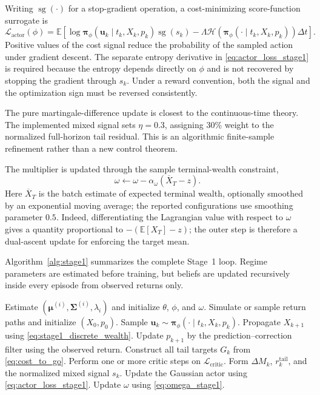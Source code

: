 \documentclass[a4paper,10pt]{article}
\newcommand{\E}{\mathbb{E}}
\newcommand{\bpi}{\bm{\pi}}
\newcommand{\bmu}{\bm{\mu}}
\newcommand{\bu}{\bm{u}}
\newcommand{\bSigma}{\bm{\Sigma}}
\newcommand{\cH}{\mathcal{H}}
\begin{document}
Writing $\operatorname{sg}(\cdot)$ for a stop-gradient operation, a cost-minimizing score-function surrogate is
\begin{equation}
\mathcal L_{\mathrm{actor}}(\phi)
=\E\left[
\log\bpi_\phi(\bu_k\mid t_k,X_k,p_k)\operatorname{sg}(s_k)
-\Lambda\cH(\bpi_\phi(\cdot\mid t_k,X_k,p_k))\Delta t
\right].
\label{eq:actor_loss_stage1}
\end{equation}
Positive values of the cost signal reduce the probability of the sampled action under gradient descent. The separate entropy derivative in \eqref{eq:actor_loss_stage1} is required because the entropy depends directly on $\phi$ and is not recovered by stopping the gradient through $s_k$. Under a reward convention, both the signal and the optimization sign must be reversed consistently.

The pure martingale-difference update is closest to the continuous-time
theory. The implemented mixed signal sets $\eta=0.3$, assigning 30\% weight
to the normalized full-horizon tail residual. This is an algorithmic
finite-sample refinement rather than a new control theorem.

The multiplier is updated through the sample terminal-wealth constraint,
\begin{equation}
\omega\leftarrow\omega-\alpha_\omega(\overline X_T-z).
\label{eq:omega_stage1}
\end{equation}
Here $\overline X_T$ is the batch estimate of expected terminal wealth, optionally smoothed by an exponential moving average; the reported configurations use smoothing parameter $0.5$. Indeed, differentiating the Lagrangian value with respect to $\omega$ gives a quantity proportional to $-(\E[X_T]-z)$; the outer step is therefore a dual-ascent update for enforcing the target mean.

Algorithm~\ref{alg:stage1} summarizes the complete Stage~1 loop. Regime parameters are estimated before training, but beliefs are updated recursively inside every episode from observed returns only.

\begin{algorithm}[H]
\caption{Stage~1 HJB-guided actor--critic under partial information}
\label{alg:stage1}
\begin{algorithmic}[1]
\State Estimate $(\bmu^{(i)},\bSigma^{(i)},\lambda_i)$ and initialize $\theta$, $\phi$, and $\omega$.
  \State Simulate or sample return paths and initialize $(X_0,p_0)$.
    \State Sample $\bu_k\sim\bpi_\phi(\cdot\mid t_k,X_k,p_k)$.
    \State Propagate $X_{k+1}$ using \eqref{eq:stage1_discrete_wealth}.
    \State Update $p_{k+1}$ by the prediction--correction filter using the observed return.
  \EndFor
  \State Construct all tail targets $G_k$ from \eqref{eq:cost_to_go}.
  \State Perform one or more critic steps on $\mathcal L_{\mathrm{critic}}$.
  \State Form $\Delta M_k$, $r_k^{\mathrm{tail}}$, and the normalized mixed signal $s_k$.
  \State Update the Gaussian actor using \eqref{eq:actor_loss_stage1}.
  \State Update $\omega$ using \eqref{eq:omega_stage1}.
\EndFor
\end{algorithmic}
\end{algorithm}
\end{document}
